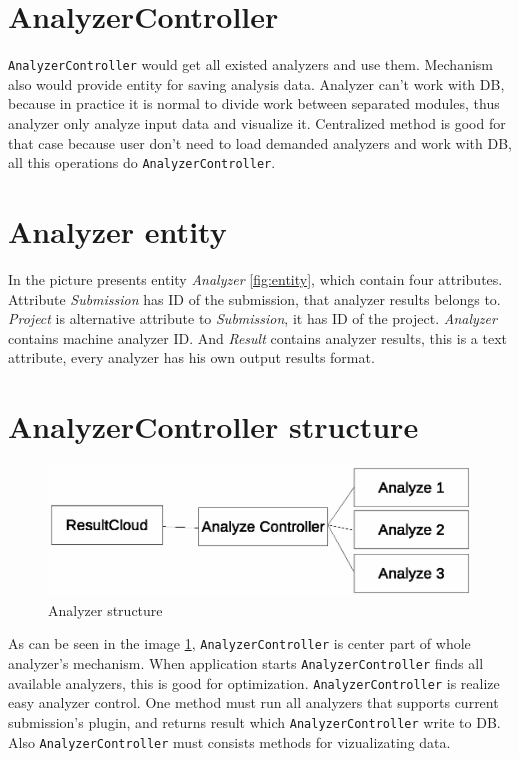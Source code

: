 \section{AnalyzerController}

\texttt{AnalyzerController} would get all existed analyzers and use them. Mechanism also would provide entity for saving analysis data. Analyzer can't work with DB, because in practice it is normal to divide work between separated modules, thus analyzer only analyze input data and visualize it. Centralized method is good for that case because user don't need to load demanded analyzers and work with DB, all this operations do \texttt{AnalyzerController}.

\section{Analyzer entity}

In the picture presents entity \emph{Analyzer} \ref{fig:entity}, which contain four attributes. Attribute \emph{Submission} has ID of the submission, that analyzer results belongs to. \emph{Project} is alternative attribute to \emph{Submission}, it has ID of the project. \emph{Analyzer} contains machine analyzer ID. And \emph{Result} contains analyzer results, this is a text attribute, every analyzer has his own output results format.

\section{AnalyzerController structure}

\begin{figure}
  \centering
    \includegraphics[trim=0 22cm 0 0,scale=0.8]{fig/analyzer-struct.eps}
  \caption{Analyzer structure}
  \label{fig:an_struct}
\end{figure}

As can be seen in the image \ref{fig:an_struct}, \texttt{AnalyzerController} is center part of whole analyzer's mechanism. When application starts \texttt{AnalyzerController} finds all available analyzers, this is good for optimization. \texttt{AnalyzerController} is realize easy analyzer control. One method must run all analyzers that supports current submission's plugin, and returns result which \texttt{AnalyzerController} write to DB. Also \texttt{AnalyzerController} must consists methods for vizualizating data.

